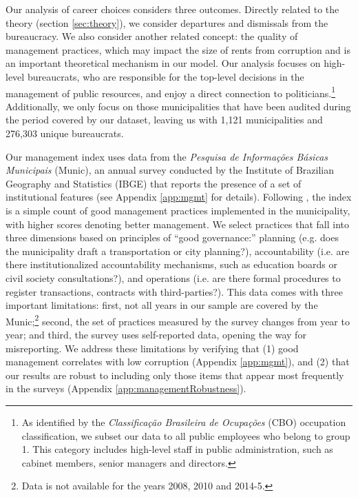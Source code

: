 \documentclass[12pt,a4paper]{article}
\theoremstyle{definition}
\begin{document}
\begin{table}[h]
    \centering
    \footnotesize
	
	\caption{{\bf Descriptive statistics.} This table reports descriptive statistics about the 1,112 municipalities that have been audited between 2006 and 2015 and their employees. Unless otherwise specified, all measures are municipality-year averages.}
    \label{tbl:desc}
\end{table}

Our analysis of career choices considers three outcomes. Directly related to the theory (section \ref{sec:theory}), we consider departures and dismissals from the bureaucracy. We also consider another related concept: the quality of management practices, which may impact the size of rents from corruption and is an important theoretical mechanism in our model. Our analysis focuses on high-level bureaucrats, who are responsible for the top-level decisions in the management of public resources, and enjoy a direct connection to politicians.\footnote{As identified by the \textit{Classificação Brasileira de Ocupações} (CBO) occupation classification, we subset our data to all public employees who belong to group 1. This category includes high-level staff in public administration, such as cabinet members, senior managers and directors.} Additionally, we only focus on those municipalities that have been audited during the period covered by our dataset, leaving us with 1,121 municipalities and 276,303 unique bureaucrats. 

Our management index uses data from the \textit{Pesquisa de Informações Básicas Municipais} (Munic), an annual survey conducted by the Institute of Brazilian Geography and Statistics (IBGE) that reports the presence of a set of institutional features (see Appendix \ref{app:mgmt} for details). Following \citet{grindle_good_2004,Bloom2007}, the index is a simple count of good management practices implemented in the municipality, with higher scores denoting better management. We select practices that fall into three dimensions based on principles of ``good governance:'' planning (e.g. does the municipality draft a transportation or city planning?), accountability (i.e. are there institutionalized accountability mechanisms, such as education boards or civil society consultations?), and operations (i.e. are there formal procedures to register transactions, contracts with third-parties?). This data comes with three important limitations: first, not all years in our sample are covered by the Munic;\footnote{Data is not available for the years 2008, 2010 and 2014-5.} second, the set of practices measured by the survey changes from year to year; and third, the survey uses self-reported data, opening the way for misreporting. We address these limitations by verifying that (1) good management correlates with low corruption (Appendix \ref{app:mgmt}), and (2) that our results are robust to including only those items that appear most frequently in the surveys (Appendix \ref{app:managementRobustness}). 
\end{document}
